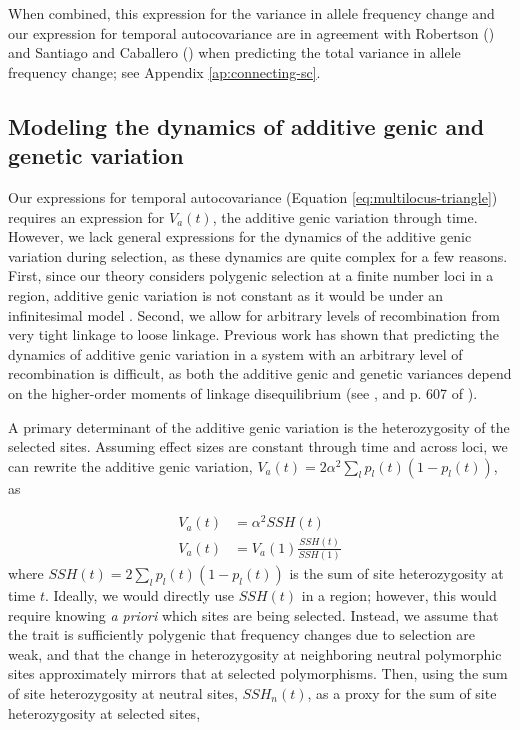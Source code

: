\documentclass[11pt]{article}
\begin{document}
When combined, this expression for the variance in allele frequency change
and our expression for temporal autocovariance are in agreement with
Robertson (\citeyear{Robertson1961-ho}) and Santiago and Caballero
(\citeyear{Santiago1995-hx, Santiago1998-bs}) when predicting the total
variance in allele frequency change; see Appendix \ref{ap:connecting-sc}.

\subsection{Modeling the dynamics of additive genic and genetic variation}
\label{sec:dyn-var}

Our expressions for temporal autocovariance (Equation
\ref{eq:multilocus-triangle}) requires an expression for $V_a(t)$, the additive
genic variation through time.  However, we lack general expressions for the
dynamics of the additive genic variation during selection, as these dynamics
are quite complex for a few reasons. First, since our theory considers
polygenic selection at a finite number loci in a region, additive genic
variation is not constant as it would be under an infinitesimal model
\parencite{Bulmer1980-zo}. Second, we allow for arbitrary levels of
recombination from very tight linkage to loose linkage.  Previous work has
shown that predicting the dynamics of additive genic variation in a system with
an arbitrary level of recombination is difficult, as both the additive genic
and genetic variances depend on the higher-order moments of linkage
disequilibrium (see \cite{Barton1987-gl}, and p. 607 of \cite{Turelli1990-kd}). 

A primary determinant of the additive genic variation is the heterozygosity of
the selected sites. Assuming effect sizes are constant through time and across
loci, we can rewrite the additive genic variation, $V_a(t) = 2 \alpha^2 \sum_l
p_l(t) (1-p_l(t))$, as

\begin{align}
  V_a(t) &= \alpha^2 SSH(t) \\
  V_a(t) &= V_a(1) \frac{SSH(t)}{SSH(1)}
\end{align}
%
where $SSH(t) = 2 \sum_l p_l(t) (1-p_l(t))$ is the sum of site heterozygosity
at time $t$.  Ideally, we would directly use $SSH(t)$ in a region; however,
this would require knowing \emph{a priori} which sites are being 
selected. Instead, we assume that the trait is sufficiently polygenic that
frequency changes due to selection are weak, and that the change in
heterozygosity at neighboring neutral polymorphic sites approximately mirrors that at
selected polymorphisms. Then, using the sum of site heterozygosity at neutral
sites, $SSH_n(t)$, as a proxy for the sum of site heterozygosity at selected
sites, 
\end{document}
